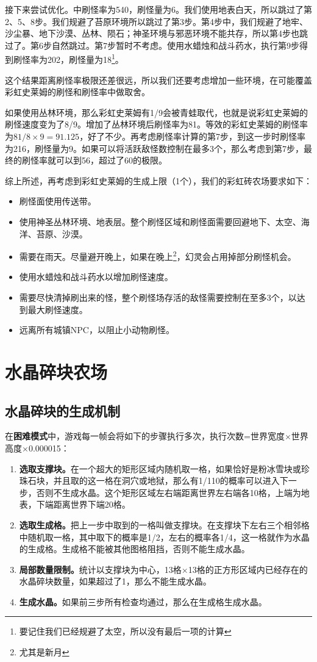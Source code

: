 接下来尝试优化。中刷怪率为540，刷怪量为6。我们使用地表白天，所以跳过了第2、5、8步。我们规避了苔原环境所以跳过了第3步。第4步中，我们规避了地牢、沙尘暴、地下沙漠、丛林、陨石；神圣环境与邪恶环境不能共存，所以第4步也跳过了。第6步自然跳过。第7步暂时不考虑。使用水蜡烛和战斗药水，执行第9步得到刷怪率为202，刷怪量为18\footnote{要记住我们已经规避了太空，所以没有最后一项的计算}。

这个结果距离刷怪率极限还差很远，所以我们还要考虑增加一些环境，在可能覆盖彩虹史莱姆的刷怪和刷怪率中做取舍。

如果使用丛林环境，那么彩虹史莱姆有1/9会被青蛙取代，也就是说彩虹史莱姆的刷怪速度变为了8/9。增加了丛林环境后刷怪率为81。等效的彩虹史莱姆的刷怪率为$81/8\times 9=91.125$，好了不少。再考虑刷怪率计算的第7步，到这一步时刷怪率为216，刷怪量为9。如果可以将活跃敌怪数控制在最多3个，那么考虑到第7步，最终的刷怪率就可以到56，超过了60的极限。

综上所述，再考虑到彩虹史莱姆的生成上限（1个），我们的彩虹砖农场要求如下：
\begin{itemize}
\item 刷怪面使用传送带。
\item 使用神圣丛林环境、地表层。整个刷怪区域和刷怪面需要回避地下、太空、海洋、苔原、沙漠。
\item 需要在雨天。尽量避开晚上，如果在晚上\footnote{尤其是新月}，幻灵会占用掉部分刷怪机会。
\item 使用水蜡烛和战斗药水以增加刷怪速度。
\item 需要尽快清掉刷出来的怪，整个刷怪场存活的敌怪需要控制在至多3个，以达到最大刷怪速度。
\item 远离所有城镇NPC，以阻止小动物刷怪。
\end{itemize}

\section{水晶碎块农场}
\subsection{水晶碎块的生成机制}
在\textbf{困难模式}中，游戏每一帧会将如下的步骤执行多次，执行次数=世界宽度$\times$世界高度$\times$0.000015：
\begin{enumerate}
    \item \textbf{选取支撑块。}在一个超大的矩形区域内随机取一格，如果恰好是粉冰雪块或珍珠石块，并且取的这一格在洞穴或地狱，那么有1/110的概率可以进入下一步，否则不生成水晶。这个矩形区域左右端距离世界左右端各10格，上端为地表，下端距离世界下端20格。
    \item \textbf{选取生成格。}把上一步中取到的一格叫做支撑块。在支撑块下左右三个相邻格中随机取一格，其中取下的概率是1/2，左右的概率各1/4，这一格就作为水晶的生成格。生成格不能被其他图格阻挡，否则不能生成水晶。
    \item \textbf{局部数量限制。}统计以支撑块为中心，13格$\times$13格的正方形区域内已经存在的水晶碎块数量，如果超过了1，那么不能生成水晶。
    \item \textbf{生成水晶。}如果前三步所有检查均通过，那么在生成格生成水晶。
\end{enumerate}

